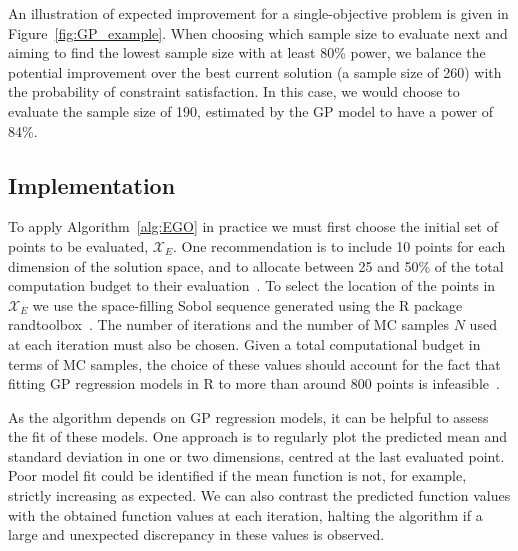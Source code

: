 \documentclass[]{sagej}
\begin{document}
An illustration of expected improvement for a single-objective problem is given in Figure~\ref{fig:GP_example}. When choosing which sample size to evaluate next and aiming to find the lowest sample size with at least 80\% power, we balance the potential improvement over the best current solution (a sample size of 260) with the probability of constraint satisfaction. In this case, we would choose to evaluate the sample size of 190, estimated by the GP model to have a power of 84\%.


\subsection{Implementation}

To apply Algorithm~\ref{alg:EGO} in practice we must first choose the initial set of points to be evaluated, $\mathcal{X}_{E}$. One recommendation is to include 10 points for each dimension of the solution space, and to allocate between 25 and 50\% of the total computation budget to their evaluation~\cite{}. To select the location of the points in $\mathcal{X}_{E}$ we use the space-filling Sobol sequence generated using the R package randtoolbox~\cite{Dutang2015}. The number of iterations and the number of MC samples $N$ used at each iteration must also be chosen. Given a total computational budget in terms of MC samples, the choice of these values should account for the fact that fitting GP regression models in R to more than around 800 points is infeasible~\cite{Chevalier2014}. 

As the algorithm depends on GP regression models, it can be helpful to assess the fit of these models. One approach is to regularly plot the predicted mean and standard deviation in one or two dimensions, centred at the last evaluated point. Poor model fit could be identified if the mean function is not, for example, strictly increasing as expected. We can also contrast the predicted function values with the obtained function values at each iteration, halting the algorithm if a large and unexpected discrepancy in these values is observed.
\end{document}

